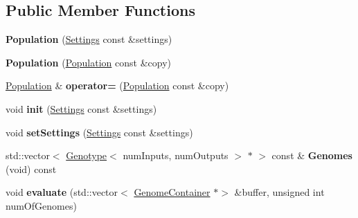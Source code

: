 \subsection*{Public Member Functions}
\begin{DoxyCompactItemize}
\item 
\mbox{\label{class_indie_neat_1_1_population_ab9c85c50e1476700ad373a8f536e8898}} 
{\bfseries Population} (\hyperlink{struct_indie_neat_1_1_population_1_1_settings}{Settings} const \&settings)
\item 
\mbox{\label{class_indie_neat_1_1_population_a32ef3a36f8b74bd4a75981e0d3ec1d2b}} 
{\bfseries Population} (\hyperlink{class_indie_neat_1_1_population}{Population} const \&copy)
\item 
\mbox{\label{class_indie_neat_1_1_population_a24b43b8cd8743d15542980e124acb6a5}} 
\hyperlink{class_indie_neat_1_1_population}{Population} \& {\bfseries operator=} (\hyperlink{class_indie_neat_1_1_population}{Population} const \&copy)
\item 
\mbox{\label{class_indie_neat_1_1_population_a250935f7589600cd6ed661288c09f760}} 
void {\bfseries init} (\hyperlink{struct_indie_neat_1_1_population_1_1_settings}{Settings} const \&settings)
\item 
\mbox{\label{class_indie_neat_1_1_population_ab8d6e15a79aa6138e3c369718a727690}} 
void {\bfseries set\+Settings} (\hyperlink{struct_indie_neat_1_1_population_1_1_settings}{Settings} const \&settings)
\item 
\mbox{\label{class_indie_neat_1_1_population_a22efadab423680576c832cf3a575f49a}} 
std\+::vector$<$ \hyperlink{class_indie_neat_1_1_genotype}{Genotype}$<$ num\+Inputs, num\+Outputs $>$ $\ast$ $>$ const  \& {\bfseries Genomes} (void) const
\item 
\mbox{\label{class_indie_neat_1_1_population_a721b58835393fd9cb534e7c3838277eb}} 
void {\bfseries evaluate} (std\+::vector$<$ \hyperlink{struct_indie_neat_1_1_population_1_1_genome_container}{Genome\+Container} $\ast$$>$ \&buffer, unsigned int num\+Of\+Genomes)
$$
\end{DoxyCompactItemize}
